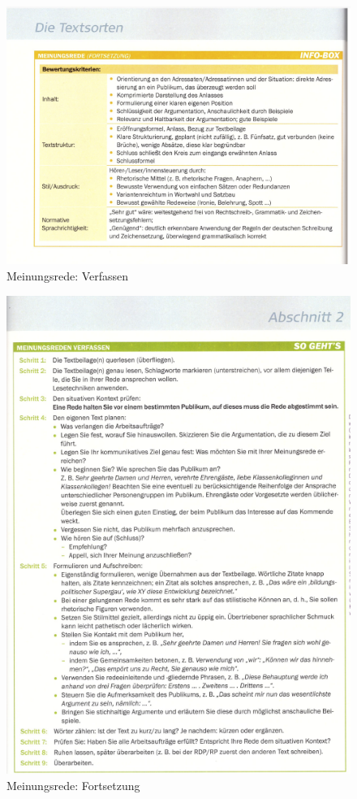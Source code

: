 \begin{figure}[h]
    \centering
    \includegraphics[scale=0.8]{pics/Screenshot from 2023-02-06 12-30-22.png}
    \caption{Meinungsrede: Verfassen}
    \label{fig:impl:Meinungsrede2}
\end{figure}
\begin{figure}[h]
    \centering
    \includegraphics[scale=0.8]{pics/Screenshot from 2023-02-06 12-30-34.png}
    \caption{Meinungsrede: Fortsetzung}
    \label{fig:impl:Meinungsrede3}
\end{figure}

